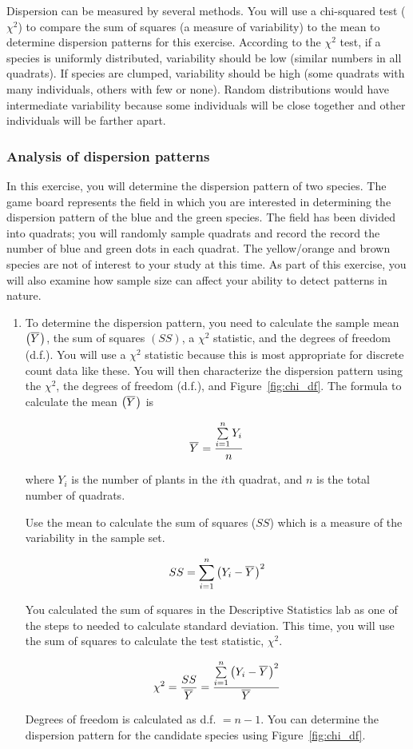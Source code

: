 \documentclass[12pt, hidelinks]{exam}
\newcommand\chisq{$\chi^2$}
\newcommand*\meanY{\overline{Y}\kern0.67pt}
\begin{document}
Dispersion can be measured by several methods. You will use
a chi-squared test (\kern1.1667pt\chisq{}) to compare the sum of squares
(a measure of variability) to the mean to determine dispersion patterns
for this exercise. According to the \chisq{} test, if a species is
uniformly distributed, variability should be low (similar numbers in all
quadrats). If species are clumped, variability should be high (some
quadrats with many individuals, others with few or none). Random
distributions would have intermediate variability because some individuals
will be close together and other individuals will be farther apart.

\subsubsection*{Analysis of dispersion patterns}

In this exercise, you will determine the dispersion pattern of two
species. The game board represents the field in which you are interested
in determining the dispersion pattern of the blue and the green species.
The field has been divided into quadrats; you will randomly sample quadrats
and record the record the number of blue and green dots in each quadrat.
The yellow/orange and brown species are not of interest to your study at
this time. As part of this exercise, you will also examine how sample
size can affect your ability to detect patterns in nature.

\begin{enumerate}

\item To determine the dispersion pattern, you need to calculate the sample
mean $\left( \meanY\right) $, the sum of squares $(SS)$, a \chisq{} statistic, and the
degrees of freedom (d.f.). You will use a \chisq{} statistic
because this is most appropriate for discrete count data like these.
 You will then characterize the dispersion pattern using the
\chisq{}, the degrees of freedom (d.f.), and Figure~\ref{fig:chi_df}. The formula 
to calculate the mean $\left( \meanY \right)$ is


\[\meanY = \dfrac{\sum\limits_{i=1}^n Y_i}{n}\]

where $Y_i$ is the number of plants in the $i\mathrm{th}$ quadrat, and $n$ is the total number of quadrats.


Use the mean to calculate the sum of squares ($SS$) which is a measure of the variability in the sample set.  

\[SS =  \sum\limits_{i=1}^n \left( Y_i - \meanY \right) ^2 \]


You calculated the sum of squares in the Descriptive Statistics lab as one of the steps to needed to calculate standard deviation. This time, you will use the sum of squares to calculate the test statistic, \chisq{}. 

\[ \chi^2 = \dfrac{SS}{\meanY} = \dfrac{\sum\limits_{i=1}^n \left( Y_i - \meanY \right) ^2}{\meanY}\]

Degrees of freedom is calculated as d.f. $= n-1.$  You can determine the dispersion pattern for the candidate species using Figure~\ref{fig:chi_df}.  

\end{enumerate}
\end{document}
